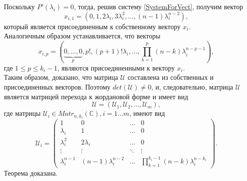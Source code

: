 Поскольку $P'(\lambda_i)=0$, тогда, решив систему \eqref{SystemForVect}, получим вектор 
$$x_{i,1} = \left(0, 1, 2 \lambda_i, 3 \lambda_i ^2, \dots, (n-1)\lambda_i ^{n-2} \right), $$ который является присоединенным к собственному вектору $x_i$. \\
Аналогичным образом устанавливается, что векторы 
$$
x_{i,p} = \left(\underbrace{0, \dots, 0}_{{p}}, p!, (p+1)! \lambda_i, \dots, \prod_{k=1}^p(n-k)\lambda_i ^{n-p-1} \right),
$$
где $1 \le p \le {k_i-1}$, являются присоединенными к вектору $x_i$. \\
Таким образом, доказано, что матрица $\mathcal{U}$ составлена из собственных и присоединенных векторов. Поэтому $det(\mathcal{U}) \ne 0$, и, следовательно, матрица $\mathcal{U}$ является матрицей перехода к жордановой форме и имеет вид 
$$
\mathcal{U} = \left( \mathcal{U}_1, \mathcal{U}_2, \dots, \mathcal{U}_m \right),
$$
где матрицы $\mathcal{U}_i \in Matr_{n,k_i} (\mathbb{C}), i=1 \dots m$, имеют вид
$$
\mathcal{U}_i = \begin{pmatrix}
1 & 0 & \dots & 0 \\
\lambda_i & 1 & \dots & 0 \\ 
\lambda_i^2 & 2\lambda_i & \dots & 0 \\
\vdots & \vdots & \ddots & \vdots \\
\lambda_i^{n-1} & (n-1)\lambda_i^{n-2} & \dots & \prod_{k=1}^{k_i-1}(n-k)\lambda_i^{n-k_i}
\end{pmatrix}.
$$
Теорема доказана. 